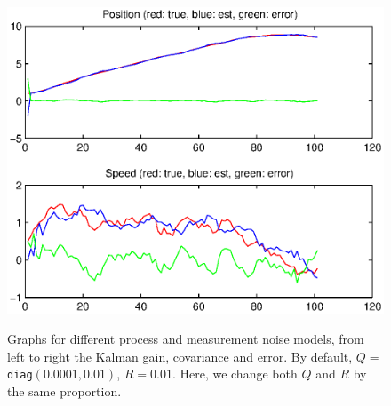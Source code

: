 \documentclass[a4paper,12pt]{article}
\begin{document}
\begin{enumerate}
\begin{figure}
{{        \includegraphics[width=.43\textwidth]{figures/kf/rqlow_error}
      }
    }
    \caption{Graphs for different process and measurement noise models, from
        left to right the Kalman gain, covariance and error. By default,
        $Q=$ \texttt{diag}$(0.0001,0.01)$, $R=0.01$. Here, we change both $Q$ and
      $R$ by the same proportion.}
    \label{fig:prop}
  \end{figure}
  

\end{enumerate}
\end{document}

